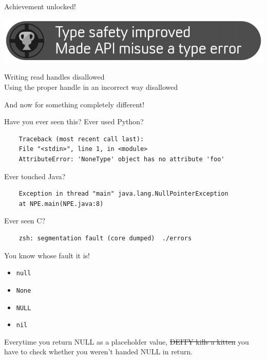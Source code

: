 \documentclass{beamer}
\begin{document}
\begin{frame}{Achievement unlocked!}
  \begin{center}
    \includegraphics[width=\textwidth]{achivement-api-misuse}
  \end{center}
  \checkmark Writing read handles disallowed\\
  \checkmark Using the proper handle in an incorrect way disallowed
\end{frame}

\begin{frame}
  \begin{center}
    {\Huge And now for something completely different!}
  \end{center}
\end{frame}

\begin{frame}[fragile]{Have you ever seen this?}
  Ever used Python?
  \begin{verbatim}
    Traceback (most recent call last):
    File "<stdin>", line 1, in <module>
    AttributeError: 'NoneType' object has no attribute 'foo'
  \end{verbatim}
  \pause
  Ever touched Java?
  \begin{verbatim}
    Exception in thread "main" java.lang.NullPointerException
    at NPE.main(NPE.java:8)
  \end{verbatim}
  \pause
  Ever seen C?
  \begin{verbatim}
    zsh: segmentation fault (core dumped)  ./errors
  \end{verbatim}
\end{frame}

\begin{frame}
  You know whose fault it is!
  \begin{itemize}
    \item \texttt{null}
    \item \texttt{None}
    \item \texttt{NULL}
    \item \texttt{nil}
  \end{itemize}
  \pause
  Everytime you return NULL as a placeholder value,
  \sout{\textdollar{}DEITY kills a kitten}
  you have to check whether you weren't handed NULL in return.
\end{frame}
\end{document}
